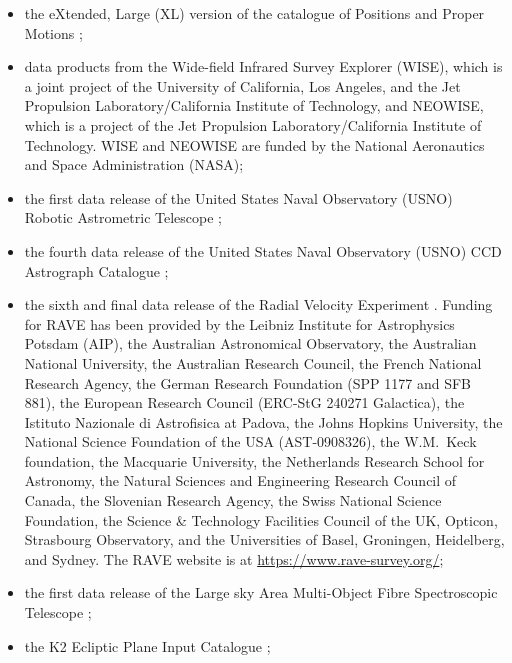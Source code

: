 \documentclass[longauth]{aa}
\begin{document}
\begin{appendix}
\begin{itemize}
\item the eXtended, Large (XL) version of the catalogue of Positions and Proper Motions \citep[PPM-XL,][]{2010AJ....139.2440R};
\item data products from the Wide-field Infrared Survey Explorer (WISE), which is a joint project of the University of California, Los Angeles, and the Jet Propulsion Laboratory/California Institute of Technology, and NEOWISE, which is a project of the Jet Propulsion Laboratory/California Institute of Technology. WISE and NEOWISE are funded by the National Aeronautics and Space Administration (NASA);
\item the first data release of the United States Naval Observatory (USNO) Robotic Astrometric Telescope \citep[URAT-1,][]{urat1};
\item the fourth data release of the United States Naval Observatory (USNO) CCD Astrograph Catalogue \citep[UCAC-4,][]{2013AJ....145...44Z};
\item the sixth and final data release of the Radial Velocity Experiment \citep[RAVE DR6,][]{2020AJ....160...83S,rave6a}. Funding for RAVE has been provided by the Leibniz Institute for Astrophysics Potsdam (AIP), the Australian Astronomical Observatory, the Australian National University, the Australian Research Council, the French National Research Agency, the German Research Foundation (SPP 1177 and SFB 881), the European Research Council (ERC-StG 240271 Galactica), the Istituto Nazionale di Astrofisica at Padova, the Johns Hopkins University, the National Science Foundation of the USA (AST-0908326), the W.M.\ Keck foundation, the Macquarie University, the Netherlands Research School for Astronomy, the Natural Sciences and Engineering Research Council of Canada, the Slovenian Research Agency, the Swiss National Science Foundation, the Science \& Technology Facilities Council of the UK, Opticon, Strasbourg Observatory, and the Universities of Basel, Groningen, Heidelberg, and Sydney. The RAVE website is at \url{https://www.rave-survey.org/};
\item the first data release of the Large sky Area Multi-Object Fibre Spectroscopic Telescope \citep[LAMOST DR1,][]{LamostDR1};
\item the K2 Ecliptic Plane Input Catalogue \citep[EPIC,][]{epic-2016ApJS..224....2H};

\end{itemize}
\end{appendix}
\end{document}
